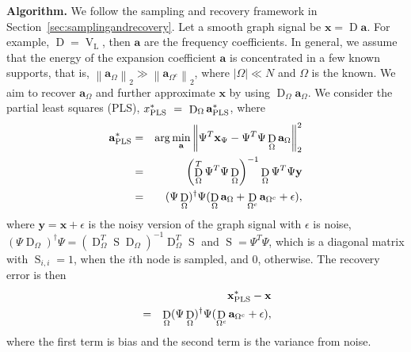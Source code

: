 \documentclass[journal,twocolumn,10pt]{IEEEtran}
\theoremstyle{definition}
\newcommand{\mypar}[1]{{\bf #1.}}
\def\a{\mathbf{a}}
\def\x{\mathbf{x}}
\def\y{\mathbf{y}}
\DeclareMathOperator{\LL}{L}
\DeclareMathOperator{\D}{D}
\DeclareMathOperator{\Vm}{V}
\DeclareMathOperator{\Ss}{S}
\begin{document}
\mypar{Algorithm}
We follow the sampling and recovery framework in Section~\ref{sec:samplingandrecovery}.
Let a smooth graph signal be $\x = \D \a$. For example, $\D = \Vm_{\LL}$, then $\a$ are the frequency coefficients. In general, we assume that the energy of the expansion coefficient $\a$ is concentrated in a few known supports, that is, $\left\| \a_{\Omega} \right\|_2 \gg \left\| \a_{\Omega^c} \right\|_2$, where $|\Omega| \ll N $ and $\Omega$ is the known. We aim to recover $\a_{\Omega}$ and further approximate $\x$ by using $\D_{\Omega}\a_{\Omega}$. We consider the partial least squares (PLS), $x^*_{\rm PLS}  \ = \  \D_{\Omega}  \a^*_{\rm PLS} $, where
\begin{eqnarray}
\label{eq:PLS}
  \a^*_{\rm PLS}  & = & 	
	  \arg \min_{ \a}  \left\|  \Psi^T \x_{\Psi} -  \Psi^T \Psi  \D_{\Omega} \a_{\Omega} \right\|_2^2
	\nonumber
	\\
	& = &   \left(  \D_{\Omega}^T \Psi^T \Psi \D_{\Omega} \right)^{-1}  \D_{\Omega} \Psi^T \Psi \y
	\nonumber
	\\
	\nonumber
	& = & (\Psi \D_{\Omega} )^{\dagger} \Psi ( \D_{\Omega} \a_{\Omega} + \D_{\Omega^c} \a_{\Omega^c}  + \epsilon ),
\end{eqnarray}
where $\y = \x + \epsilon$ is the noisy version of the graph signal with $\epsilon$ is noise, $(\Psi \D_{\Omega} )^{\dagger} \Psi = \left(  \D_{\Omega}^T \Ss  \D_{\Omega} \right)^{-1}  \D_{\Omega}^T \Ss$ and $\Ss =  \Psi^T \Psi$, which is a diagonal matrix with $\Ss_{i,i}= 1$, when the $i$th node is sampled, and 0, otherwise. The recovery error is then
\begin{eqnarray*}
&&   \x^*_{\rm PLS}  - \x
\\
& = & \D_{\Omega}  (\Psi \D_{\Omega} )^{\dagger} \Psi ( \D_{\Omega^c} \a_{\Omega^c}  + \epsilon ),
\end{eqnarray*}
where the first term is bias and the second term is the variance from noise. 
\end{document}

